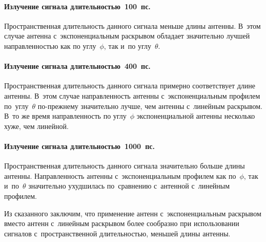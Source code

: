 \paragraph*{Излучение сигнала длительностью~100~пс.}
Пространственная длительность данного сигнала меньше длины антенны. В~этом
случае антенна с~экспоненциальным раскрывом обладает значительно лучшей
направленностью как по углу~$\phi$, так и~по углу~$\theta$.

\paragraph*{Излучение сигнала длительностью~400~пс.}
Пространственная длительность данного сигнала примерно соответствует длине
антенны. В~этом случае направленность антенны с~экспоненциальным профилем
по~углу~$\theta$ по-прежнему значительно лучше, чем антенны с~линейным
раскрывом. В~то же время направленность по углу~$\phi$ экспоненциальной антенны
несколько хуже, чем линейной.

\paragraph*{Излучение сигнала длительностью~1000~пс.}
Пространственная длительность данного сигнала значительно больше длины антенны.
Направленность антенны с~экспоненциальным профилем как по~$\phi$, так
и~по~$\theta$ значительно ухудшилась по~сравнению с~антенной с~линейным
профилем.

Из сказанного заключим, что применение антенн с~экспоненциальным раскрывом
вместо антенн с~линейным раскрывом более сообразно при использовании сигналов
с~пространственной длительностью, меньшей длины антенны.

